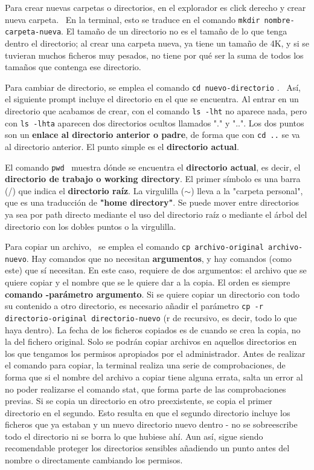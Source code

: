 \documentclass{config/apuntes}
\begin{document}
Para crear nuevas carpetas o directorios, en el explorador es click derecho y crear nueva carpeta.  \ En la terminal, esto se traduce en el comando \texttt{mkdir nombre-carpeta-nueva}. El tamaño de un directorio no es el tamaño de lo que tenga dentro el directorio; al crear una carpeta nueva, ya tiene un tamaño de 4K, y si se tuvieran muchos ficheros muy pesados, no tiene por qué ser la suma de todos los tamaños que contenga ese directorio.

Para cambiar de directorio, se emplea el comando \texttt{cd nuevo-directorio} \marginpar[\footnotesize cd]. \ Así, el siguiente prompt incluye el directorio en el que se encuentra. Al entrar en un directorio que acabamos de crear, con el comando \texttt{ls -lht} no aparece nada, pero con \texttt{ls -lhta} aparecen dos directorios ocultos llamados "." y "..". Los dos puntos son un\textbf{ enlace al directorio anterior o padre}, de forma que con \texttt{cd ..} se va al directorio anterior. El punto simple es el \textbf{directorio actual}. 

El comando \texttt{pwd}  \ muestra dónde se encuentra el \textbf{directorio actual}, es decir, el \textbf{directorio de trabajo o working directory}. El primer símbolo es una barra (/) que indica el \textbf{directorio raíz}. La virgulilla ($\sim$) lleva a la "carpeta personal", que es una traducción de \textbf{"home directory"}. Se puede mover entre directorios ya sea por path directo mediante el uso del directorio raíz o mediante el árbol del directorio con los dobles puntos o la virgulilla. 

Para copiar un archivo,  \marginpar[\footnotesize cp] \ se emplea el comando \texttt{cp archivo-original archivo-nuevo}. Hay comandos que no necesitan \textbf{argumentos}, y hay comandos (como este) que sí necesitan. En este caso, requiere de dos argumentos: el archivo que se quiere copiar y el nombre que se le quiere dar a la copia. El orden es siempre \textbf{comando -parámetro argumento}. Si se quiere copiar un directorio con todo su contenido a otro directorio, es necesario añadir el parámetro \texttt{cp -r directorio-original directorio-nuevo} (r de recursivo, es decir, todo lo que haya dentro). La fecha de los ficheros copiados es de cuando se crea la copia, no la del fichero original. Solo se podrán copiar archivos en aquellos directorios en los que tengamos los permisos apropiados por el administrador. Antes de realizar el comando para copiar, la terminal realiza una serie de comprobaciones, de forma que si el nombre del archivo a copiar tiene alguna errata, salta un error al no poder realizarse el comando stat, que forma parte de las comprobaciones previas. Si se copia un directorio en otro preexistente, se copia el primer directorio en el segundo. Esto resulta en que el segundo directorio incluye los ficheros que ya estaban y un nuevo directorio nuevo dentro - no se sobreescribe todo el directorio ni se borra lo que hubiese ahí. Aun así, sigue siendo recomendable proteger los directorios sensibles añadiendo un punto antes del nombre o directamente cambiando los permisos.
\end{document}
